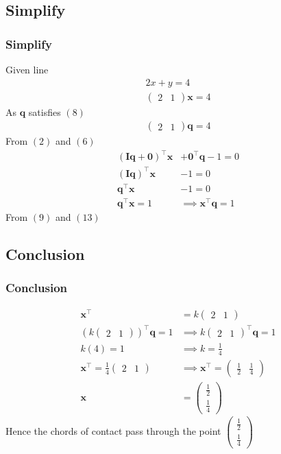 \documentclass{beamer}
\providecommand{\brak}[1]{\ensuremath{\left(#1\right)}}
\theoremstyle{remark}
\newcommand{\myvec}[1]{\ensuremath{\begin{pmatrix}#1\end{pmatrix}}}
\let\vec\mathbf
\numberwithin{equation}{section}
\begin{document}
\subsection{Simplify}
\begin{frame}
\frametitle{Simplify}
Given line 
\begin{align}
2x + y = 4 \\ 
\myvec{2&1}\vec{x}=4
\end{align}
As $\vec{q}$ satisfies \brak{8}
\begin{align}
   \myvec{2&1}\vec{q}=4 
\end{align}
From \brak{2} and \brak{6}
\begin{align}
  \brak{\vec{I}\vec{q}+\vec{0}}^\top\vec{x}&+\vec{0}^\top\vec{q}-1=0 \\
  \brak{\vec{I}\vec{q}}^\top\vec{x}&-1=0\\
  \vec{q}^\top\vec{x}&-1=0\\
  \vec{q}^\top\vec{x}=1&\implies
  \vec{x}^\top\vec{q}=1 
  \end{align}
From \brak{9} and \brak{13}
 \end{frame}
 \subsection{Conclusion}
\begin{frame}
\frametitle{Conclusion}
\begin{align}
    \vec{x}^\top&=k\myvec{2&1}\\
    \brak{k\myvec{2&1}}^\top\vec{q}=1&\implies
    k\myvec{2&1}^\top\vec{q}=1\\
    k\brak{4}=1 &\implies k=\frac{1}{4} \\
\vec{x}^\top=\frac{1}{4}\myvec{2&1} &\implies \vec{x}^\top=\myvec{\frac{1}{2}&\frac{1}{4}}\\
    \vec{x}&=\myvec{\frac{1}{2}\\\frac{1}{4}}
\end{align}
Hence the chords of contact pass through the point  $\myvec{\frac{1}{2}\\\frac{1}{4}}$
 \end{frame}
\end{document}
